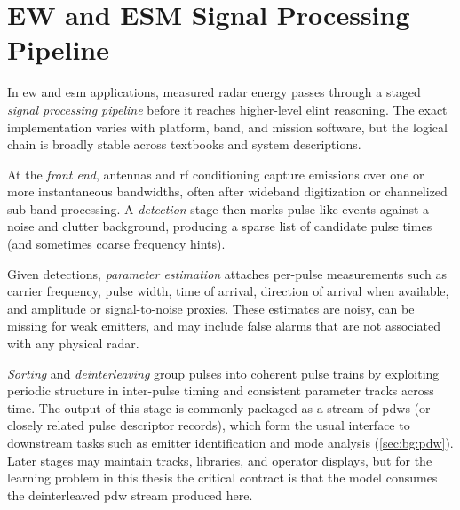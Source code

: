 \section{EW and ESM Signal Processing Pipeline}\label{sec:bg:ew_pipeline}

In \gls{ew} and \gls{esm} applications, measured radar energy passes through a staged \emph{signal processing pipeline} before it reaches higher-level \gls{elint} reasoning.
The exact implementation varies with platform, band, and mission software, but the logical chain is broadly stable across textbooks and system descriptions.

At the \emph{front end}, antennas and \gls{rf} conditioning capture emissions over one or more instantaneous bandwidths, often after wideband digitization or channelized sub-band processing.
A \emph{detection} stage then marks pulse-like events against a noise and clutter background, producing a sparse list of candidate pulse times (and sometimes coarse frequency hints).

Given detections, \emph{parameter estimation} attaches per-pulse measurements such as carrier frequency, pulse width, time of arrival, direction of arrival when available, and amplitude or signal-to-noise proxies.
These estimates are noisy, can be missing for weak emitters, and may include false alarms that are not associated with any physical radar.

\emph{Sorting} and \emph{deinterleaving} group pulses into coherent pulse trains by exploiting periodic structure in inter-pulse timing and consistent parameter tracks across time.
The output of this stage is commonly packaged as a stream of \glspl{pdw} (or closely related pulse descriptor records), which form the usual interface to downstream tasks such as emitter identification and mode analysis (\cref{sec:bg:pdw}).
Later stages may maintain tracks, libraries, and operator displays, but for the learning problem in this thesis the critical contract is that the model consumes the deinterleaved \gls{pdw} stream produced here.

